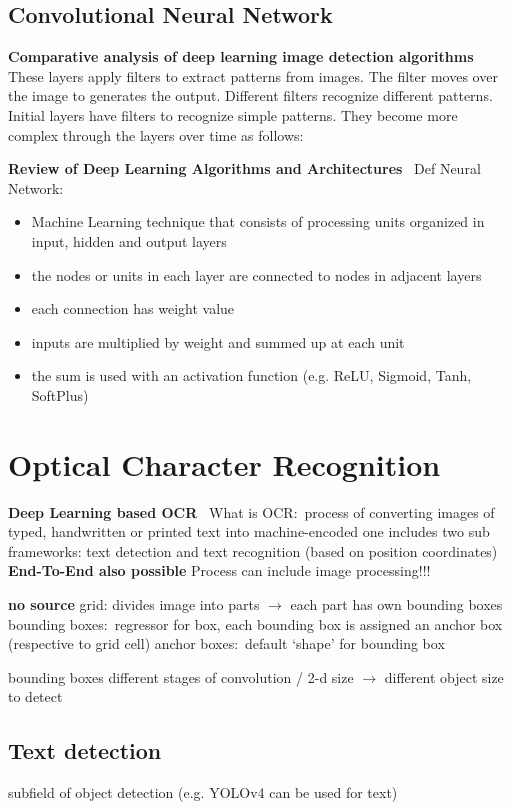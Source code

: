 \subsection*{Convolutional Neural Network}
\textbf{Comparative analysis of deep learning image detection
algorithms}~\cite{srivastava_comparative_2021}
These layers apply filters to extract patterns from images. The filter moves over the image to generates the output. Different filters recognize different patterns. Initial layers have filters to recognize simple patterns. They become more complex through the layers over time as follows:

\textbf{Review of Deep Learning Algorithms and Architectures}~\cite{shrestha_review_2019}
Def Neural Network:
\begin{itemize}
    \item Machine Learning technique that consists of processing units organized in input,
        hidden and output layers
    \item the nodes or units in each layer are connected to nodes in adjacent layers
    \item each connection has weight value
    \item inputs are multiplied by weight and summed up at each unit
    \item the sum is used with an activation function (e.g. ReLU, Sigmoid, Tanh, SoftPlus)
\end{itemize}

\section{Optical Character Recognition}

\textbf{Deep Learning based OCR}~\cite{zhao_improving_2020}
What is OCR:\ process of converting images of typed, handwritten or printed text into machine-encoded one
includes two sub frameworks: text detection and text recognition (based on position coordinates)
\textbf{End-To-End also possible}
Process can include image processing!!!


\textbf{no source}
grid: divides image into parts $\rightarrow$ each part has own bounding boxes
bounding boxes:~regressor for box, each bounding box is assigned an anchor box (respective to grid cell)
anchor boxes:~default `shape' for bounding box

bounding boxes different stages of convolution / 2-d size $\rightarrow$ different object size to detect

\subsection*{Text detection}
subfield of object detection (e.g. YOLOv4 can be used for text)

